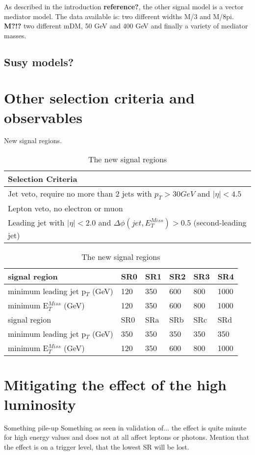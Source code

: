 As described in the introduction \textbf{reference?}, the other signal model is a vector mediator model. The data available is: two different widths M/3 and M/8pi. \textbf{M?!?}
two different mDM, 50 GeV and 400 GeV and finally a variety of mediator masses. 

\subsection{Susy models?}
\section{Other selection criteria and observables}
New signal regions.
\begin{table}[h]
\begin{center}
\begin{tabular}{l}
\hline
Selection Criteria \\ \hline
Jet veto, require no more than 2 jets with $p_T > 30 GeV$ and $|\eta| < 4.5$ \\
Lepton veto, no electron or muon \\
Leading jet with $|\eta| < 2.0$ and $\Delta \phi (jet, E_T^{Miss})>0.5$ (second-leading jet) \\ \hline
\end{tabular}
\begin{tabular}{l l l l l l}
signal region & SR0 & SR1 & SR2 & SR3 & SR4 \\ \hline
minimum leading jet p$_T$ (GeV) & 120 & 350 & 600 & 800 & 1000 \\
minimum E$^{Miss}_T$ (GeV) & 120 & 350 & 600 & 800 & 1000 \\ \hline
signal region & SR0 & SRa & SRb & SRc & SRd \\ \hline
minimum leading jet p$_T$ (GeV) & 350 & 350 & 350 & 350 & 350 \\
minimum E$^{Miss}_T$ (GeV) & 120 & 350 & 600 & 800 & 1000 \\ \hline
\end{tabular}
\label{tab:newsr}
\caption{The new signal regions}
\end{center}
\end{table}

\section{Mitigating the effect of the high luminosity}
Something pile-up
Something as seen in validation of... the effect is quite minute for high energy values and does not at all affect leptons or photons. Mention that the effect is on a trigger level, that the lowest SR will be lost.

